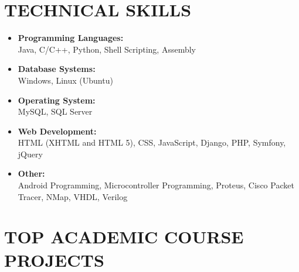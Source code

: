 \documentclass[margin]{res}
\begin{document}
\begin{resume}
\vspace{-3mm}

\section{TECHNICAL SKILLS}
	
\begin{itemize} \itemsep -8pt

\item \textbf{Programming Languages:}\\
Java, C/C++, Python, Shell Scripting, Assembly                                                      \\

\item \textbf{Database Systems:}\\
Windows, Linux (Ubuntu)                                                                             \\

\item \textbf{Operating System:}\\
MySQL, SQL Server                                                                                   \\

\item \textbf{Web Development:}\\
HTML (XHTML and HTML 5), CSS, JavaScript, Django, PHP, Symfony, jQuery                              \\

\item \textbf{Other:}\\
Android Programming, Microcontroller Programming, Proteus, Cisco Packet Tracer, NMap, VHDL, Verilog \\
	
\end{itemize} 


\vspace{-6mm}

\section{TOP ACADEMIC COURSE PROJECTS}


\end{resume}
\end{document}
